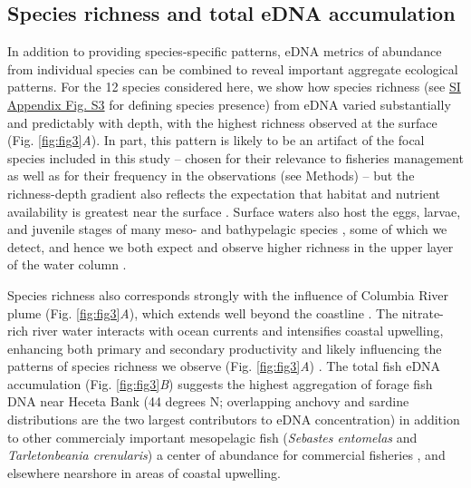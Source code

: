 \documentclass{article}
\begin{document}
\subsection*{Species richness and total eDNA accumulation}
In addition to providing species-specific patterns, eDNA metrics of abundance from individual species can be combined to reveal important aggregate ecological patterns. For the 12 species considered here, we show how species richness (see \href{SI_Appendix.pdf}{SI Appendix Fig. S3} for defining species presence) from eDNA varied substantially and predictably with depth, with the highest richness observed at the surface (Fig. \ref{fig:fig3}\textit{A}). In part, this pattern is likely to be an artifact of the focal species included in this study -- chosen for their relevance to fisheries management as well as for their frequency in the observations (see Methods) -- but the richness-depth gradient also reflects the expectation that habitat and nutrient availability is greatest near the surface \cite{smith2002,hickey2005}. Surface waters also host the eggs, larvae, and juvenile stages of many meso- and bathypelagic species \cite{parnel2008}, some of which we detect, and hence we both expect and observe higher richness in the upper layer of the water column \cite{kim2011}.

Species richness also corresponds strongly with the influence of Columbia River plume (Fig. \ref{fig:fig3}\textit{A}), which extends well beyond the coastline \cite{hickey2003}. The nitrate-rich river water interacts with ocean currents and intensifies coastal upwelling, enhancing both primary and secondary productivity \cite{hickey2010} and likely influencing the patterns of species richness we observe (Fig. \ref{fig:fig3}\textit{A}) \cite{tolimieri2015}. The total fish eDNA accumulation (Fig. \ref{fig:fig3}\textit{B}) suggests the highest aggregation of forage fish DNA near Heceta Bank (44 degrees N; overlapping anchovy and sardine distributions are the two largest contributors to eDNA concentration) in addition to other commercialy important mesopelagic fish (\textit{Sebastes entomelas} and \textit{Tarletonbeania crenularis}) a center of abundance for commercial fisheries \cite{bosley2014,Tissot2008TwentyYO}, and elsewhere nearshore in areas of coastal upwelling.
\end{document}
